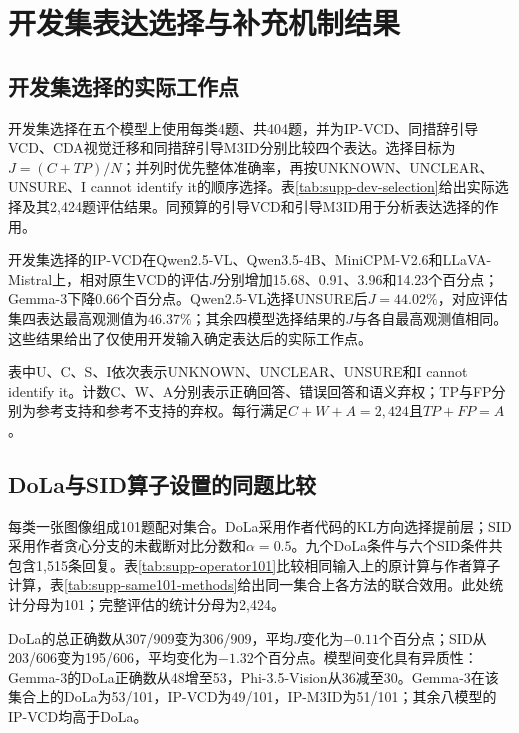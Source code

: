 \section{开发集表达选择与补充机制结果}
\label{sec:supp-development-mechanism}

\subsection{开发集选择的实际工作点}
\label{sec:supp-dev-selected}

开发集选择在五个模型上使用每类4题、共404题，并为IP-VCD、同措辞引导VCD、CDA视觉迁移和同措辞引导M3ID分别比较四个表达。选择目标为$J=(C+TP)/N$；并列时优先整体准确率，再按UNKNOWN、UNCLEAR、UNSURE、I cannot identify it的顺序选择。表\ref{tab:supp-dev-selection}给出实际选择及其2,424题评估结果。同预算的引导VCD和引导M3ID用于分析表达选择的作用。

开发集选择的IP-VCD在Qwen2.5-VL、Qwen3.5-4B、MiniCPM-V2.6和LLaVA-Mistral上，相对原生VCD的评估$J$分别增加15.68、0.91、3.96和14.23个百分点；Gemma-3下降0.66个百分点。Qwen2.5-VL选择UNSURE后$J=44.02\%$，对应评估集四表达最高观测值为$46.37\%$；其余四模型选择结果的$J$与各自最高观测值相同。这些结果给出了仅使用开发输入确定表达后的实际工作点。




表中U、C、S、I依次表示UNKNOWN、UNCLEAR、UNSURE和I cannot identify it。计数C、W、A分别表示正确回答、错误回答和语义弃权；TP与FP分别为参考支持和参考不支持的弃权。每行满足$C+W+A=2,424$且$TP+FP=A$。

\subsection{DoLa与SID算子设置的同题比较}
\label{sec:supp-author-operators}

每类一张图像组成101题配对集合。DoLa采用作者代码的KL方向选择提前层；SID采用作者贪心分支的未截断对比分数和$\alpha=0.5$\cite{chuang2024dola,huo2025sid}。九个DoLa条件与六个SID条件共包含1,515条回复。表\ref{tab:supp-operator101}比较相同输入上的原计算与作者算子计算，表\ref{tab:supp-same101-methods}给出同一集合上各方法的联合效用。此处统计分母为101；完整评估的统计分母为2,424。

DoLa的总正确数从307/909变为306/909，平均$J$变化为$-0.11$个百分点；SID从203/606变为195/606，平均变化为$-1.32$个百分点。模型间变化具有异质性：Gemma-3的DoLa正确数从48增至53，Phi-3.5-Vision从36减至30。Gemma-3在该集合上的DoLa为53/101，IP-VCD为49/101，IP-M3ID为51/101；其余八模型的IP-VCD均高于DoLa。

